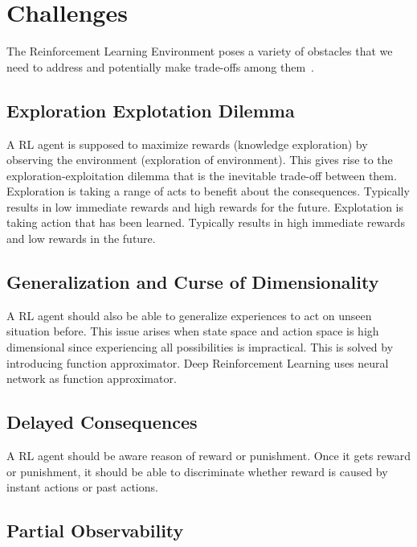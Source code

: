 \section{Challenges}
\label{sec:chal}

The Reinforcement Learning Environment poses a variety of obstacles 
that we need to address and potentially make trade-offs among them~\cite{dulac-arnold_challenges_2019, sutton_reinforcement_1998}.

\subsection{Exploration Explotation Dilemma}

A RL agent is supposed to maximize rewards (knowledge exploration) by observing the environment (exploration of environment). 
This gives rise to the exploration-exploitation dilemma that is the inevitable trade-off between them. 
Exploration is taking a range of acts to benefit about the consequences. 
Typically results in low immediate rewards and high rewards for the future. 
Explotation is taking action that has been learned. Typically results in high immediate rewards and low rewards in the future. 

\subsection{Generalization and Curse of Dimensionality}

A RL agent should also be able to generalize experiences to act on unseen situation before. 
This issue arises when state space and action space is high dimensional since experiencing all possibilities is impractical. 
This is solved by introducing function approximator. Deep Reinforcement Learning uses neural network as function approximator. 

\subsection{Delayed Consequences}

A RL agent should be aware reason of reward or punishment. 
Once it gets reward or punishment, it should be able to discriminate whether reward is caused by instant actions or past actions. 

\subsection{Partial Observability}

